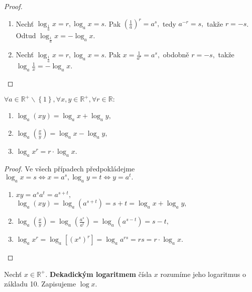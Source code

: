\begin{proof}
    \,
    \begin{enumerate}[$i.$]
        \item Nechť $\log_{\frac{1}{a}} x = r, \log_a x = s.$ Pak
        $\left ( \frac{1}{a} \right )^r = a^s,$ tedy $a^{-r}=s,$ takže $r=-s$.
        Odtud $\log_{\frac{1}{a}} x = -\log_a x.$
       	\item Nechť $\log_{\frac{1}{a}} x = r, \log_a x = s.$ Pak
        $x = \frac{1}{a^r}=a^s,$ obdobně $r=-s,$ takže $\log_a \frac{1}{x}=
        -\log_a x.$\qedhere
    \end{enumerate}
\end{proof}

\begin{veta}
    $\forall a \in \mathbb R^+ \smallsetminus \left \{ 1 \right \}, \forall x,y \in \mathbb R^+
    ,\forall r \in \mathbb R:$
    \begin{enumerate}[$i.$]
        \item $\log_a (xy)=\log_a x + \log_a y,$
       	\item $\log_a \left ( \frac{x}{y} \right ) = \log_a x - \log_a y,$
       	\item $\log_a x^r = r\cdot \log_a x.$
    \end{enumerate}
\end{veta}

\begin{proof}
    Ve všech případech předpokládejme $\log_a x = s \iff x = a^s,
    \log_a y = t \iff y = a^t.$
    \begin{enumerate}[$i.$]
        \item $xy = a^sa^t=a^{s+t},$\\
        $\log_a (xy) = \log_a (a^{s+t}) = s+t=\log_a x + \log_a y,$
       	\item $\log_a \left ( \frac{x}{y} \right )  = \log_a
        \left ( \frac{a^s}{a^t} \right ) =\log_a \left ( a^{s-t} \right ) =
        s-t,$
       	\item $\log_a x^r = \log_a \left [ \left ( x^s \right )^r  \right ] =
        \log_a a^{rs}=rs=r\cdot \log_a x.$\qedhere
    \end{enumerate}
\end{proof}

\begin{definition}
    Nechť $x\in \mathbb R^+.$ \textbf{Dekadickým logaritmem} čísla $x$ rozumíme
    jeho logaritmus o základu 10. Zapisujeme $\log x.$
\end{definition}

